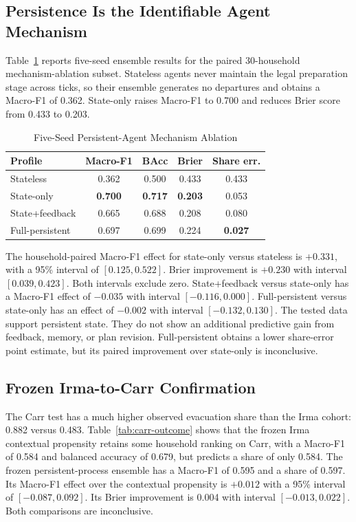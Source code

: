 \documentclass[journal]{IEEEtran}
\begin{document}
\subsection{Persistence Is the Identifiable Agent Mechanism}
Table~\ref{tab:e6} reports five-seed ensemble results for the paired
30-household mechanism-ablation subset. Stateless agents never maintain the
legal preparation
stage across ticks, so their ensemble generates no departures and obtains a
Macro-F1 of 0.362. State-only raises Macro-F1 to 0.700 and reduces Brier score
from 0.433 to 0.203.

\begin{table}[!t]
\caption{Five-Seed Persistent-Agent Mechanism Ablation}
\label{tab:e6}
\centering
\small
\begin{tabular}{lcccc}
\toprule
Profile & Macro-F1 & BAcc & Brier & Share err.\\
\midrule
Stateless & 0.362 & 0.500 & 0.433 & 0.433\\
State-only & \textbf{0.700} & \textbf{0.717} & \textbf{0.203} & 0.053\\
State+feedback & 0.665 & 0.688 & 0.208 & 0.080\\
Full-persistent & 0.697 & 0.699 & 0.224 & \textbf{0.027}\\
\bottomrule
\end{tabular}
\end{table}

The household-paired Macro-F1 effect for state-only versus stateless is
$+0.331$, with a 95\% interval of $[0.125,0.522]$. Brier improvement is
$+0.230$ with interval $[0.039,0.423]$. Both intervals exclude zero.
State+feedback versus state-only has a Macro-F1 effect of $-0.035$ with
interval $[-0.116,0.000]$. Full-persistent versus state-only has an effect of
$-0.002$ with interval $[-0.132,0.130]$. The tested data support persistent
state. They do not show an additional predictive gain from feedback, memory,
or plan revision. Full-persistent obtains a lower share-error point estimate,
but its paired improvement over state-only is inconclusive.

\subsection{Frozen Irma-to-Carr Confirmation}
The Carr test has a much higher observed evacuation share than the Irma
cohort: 0.882 versus 0.483. Table~\ref{tab:carr-outcome} shows that the frozen
Irma contextual propensity retains some household ranking on Carr, with a
Macro-F1 of 0.584 and balanced accuracy of 0.679, but predicts a share of only
0.584. The frozen persistent-process ensemble has a Macro-F1 of 0.595 and a
share of 0.597.
Its Macro-F1 effect over the contextual propensity is $+0.012$ with a 95\%
interval of $[-0.087,0.092]$. Its Brier improvement is 0.004 with interval
$[-0.013,0.022]$. Both comparisons are inconclusive.
\end{document}
